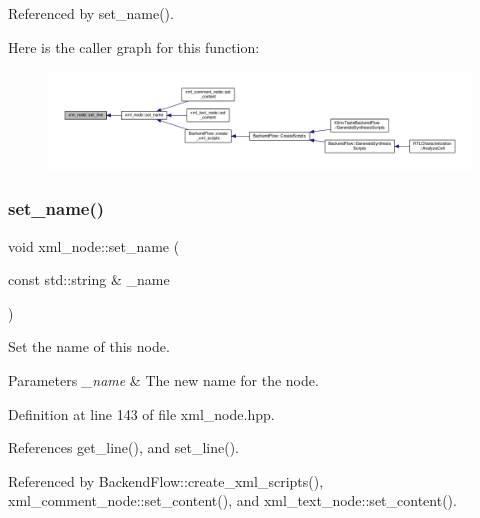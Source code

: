 Referenced by set\+\_\+name().

Here is the caller graph for this function\+:
\nopagebreak
\begin{figure}[H]
\begin{center}
\leavevmode
\includegraphics[width=350pt]{d1/dc3/classxml__node_a30f49d888b25333212fa22cf1f8205aa_icgraph}
\end{center}
\end{figure}
\mbox{\label{classxml__node_afdc073fc5ee6b09e636a6d9da116a091}} 
\subsubsection{\texorpdfstring{set\+\_\+name()}{set\_name()}}
{\footnotesize\ttfamily void xml\+\_\+node\+::set\+\_\+name (\begin{DoxyParamCaption}\item[{const std\+::string \&}]{\+\_\+name }\end{DoxyParamCaption})\hspace{0.3cm}{\ttfamily [inline]}}



Set the name of this node. 


\begin{DoxyParams}{Parameters}
{\em \+\_\+name} & The new name for the node. \\
\hline
\end{DoxyParams}


Definition at line 143 of file xml\+\_\+node.\+hpp.



References get\+\_\+line(), and set\+\_\+line().



Referenced by Backend\+Flow\+::create\+\_\+xml\+\_\+scripts(), xml\+\_\+comment\+\_\+node\+::set\+\_\+content(), and xml\+\_\+text\+\_\+node\+::set\+\_\+content().

